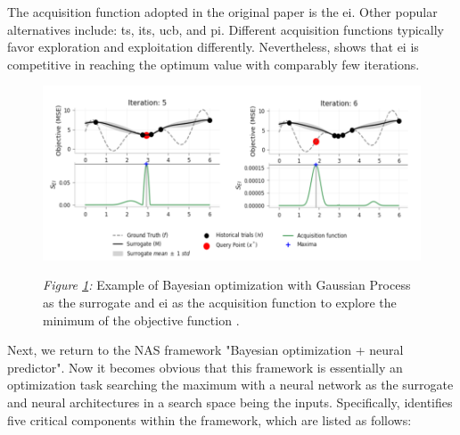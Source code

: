 \documentclass[a4paper,oneside,bibliography=totoc]{scrbook}
\begin{document}
The acquisition function adopted in the original paper \cite{Mockus1978} is the \gls{ei}. Other popular alternatives include: \gls{ts}, \gls{its}, \gls{ucb}, and \gls{pi}. Different acquisition functions typically favor exploration and exploitation differently. Nevertheless, \cite{agnihotri2020exploring} shows that \gls{ei} is competitive in reaching the optimum value with comparably few iterations. 

\begin{figure}[htbp]
	\centering
	\includegraphics[scale=0.4]{figs/overview_bo.png}
	\label{fig: bo}
	\parbox{\linewidth}{
	\vspace{0.5em}
 	{\small \textit{Figure \ref{fig: bo}:} Example of Bayesian optimization with Gaussian Process as the surrogate and \gls{ei} as the acquisition function to explore the minimum of the objective function \cite{agnihotri2020exploring}.
 	}
 	}
\end{figure}

Next, we return to the NAS framework "Bayesian optimization + neural predictor". Now it becomes obvious that this framework is essentially an optimization task searching the maximum with a neural network as the surrogate and neural architectures in a search space being the inputs. Specifically, \cite{white2019bananas} identifies five critical components within the framework, which are listed as follows:
\end{document}
